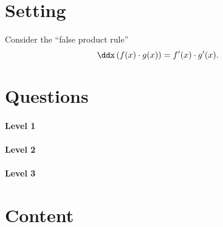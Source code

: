 \documentclass{ximera}
\begin{document}
\section{Setting}

Consider the ``false product rule''
\[
\ddx\left(f(x) \cdot g(x)\right) = f'(x)\cdot g'(x).
\]


\section{Questions}

\paragraph{Level 1}

\paragraph{Level 2}

\paragraph{Level 3}


\section{Content}
\end{document}
